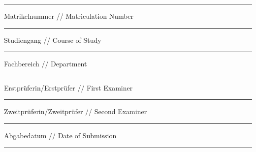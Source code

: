 {\begin{titlepage}
			\noindent\rule{15cm}{0.4pt}
			
			\vskip 0.05cm

			\begingroup
			\fontsize{8pt}{6pt}\selectfont
			Matrikelnummer // Matriculation Number
			\endgroup

			\vskip -0.15cm

			\begingroup
			\fontsize{12pt}{14pt}\selectfont
				{\@matrikelnr}
			\endgroup
			\vskip -0.15cm

			\noindent\rule{15cm}{0.4pt}

			\vskip 0.05cm

			\begingroup
			\fontsize{8pt}{6pt}\selectfont
			Studiengang // Course of Study
			\endgroup

			\vskip -0.15cm

			\begingroup
			\fontsize{12pt}{14pt}\selectfont
				{\@courseOfStudies}
			\endgroup
			\vskip -0.15cm

			\noindent\rule{15cm}{0.4pt}
			
			\vskip 0.05cm

			\begingroup
			\fontsize{8pt}{6pt}\selectfont
			Fachbereich // Department
			\endgroup

			\vskip -0.15cm

			\begingroup
			\fontsize{12pt}{14pt}\selectfont
				{\@discipline}
			\endgroup
			\vskip -0.15cm

			\noindent\rule{15cm}{0.4pt}
			
			\vskip 0.05cm

			\begingroup
			\fontsize{8pt}{6pt}\selectfont
			Erstprüferin/Erstprüfer // First Examiner
			\endgroup

			\vskip -0.15cm

			\begingroup
			\fontsize{12pt}{14pt}\selectfont
				{\@firstExaminer}
			\endgroup
			\vskip -0.15cm

			\noindent\rule{15cm}{0.4pt}
			
			\vskip 0.05cm

			\begingroup
			\fontsize{8pt}{6pt}\selectfont
			Zweitprüferin/Zweitprüfer // Second Examiner
			\endgroup

			\vskip -0.15cm

			\begingroup
			\fontsize{12pt}{14pt}\selectfont
				{\@secondExaminer}
			\endgroup
			\vskip -0.15cm

			\noindent\rule{15cm}{0.4pt}
			
			\vskip 0.05cm

			\begingroup
			\fontsize{8pt}{6pt}\selectfont
			Abgabedatum // Date of Submission
			\endgroup

			\vskip -0.15cm

			\begingroup
			\fontsize{12pt}{14pt}\selectfont
				{\@submitDate}
			\endgroup
			\vskip -0.15cm

			\noindent\rule{15cm}{0.4pt}
		\restoregeometry
	\end{titlepage}
}
\makeatother
